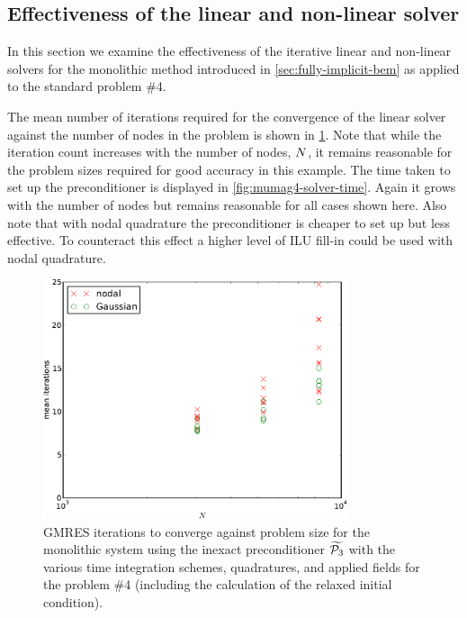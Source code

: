 \subsection{Effectiveness of the linear and non-linear solver}
\label{sec:effect-line-non}

In this section we examine the effectiveness of the iterative linear and non-linear solvers for the monolithic method introduced in \cref{sec:fully-implicit-bem} as applied to the \mumag standard problem \#4.

The mean number of iterations required for the convergence of the linear solver against the number of nodes in the problem is shown in \cref{fig:mumag4-solver-iterations}.
Note that while the iteration count increases with the number of nodes, $N$, it remains reasonable for the problem sizes required for good accuracy in this example.
The time taken to set up the preconditioner is displayed in \cref{fig:mumag4-solver-time}.
Again it grows with the number of nodes but remains reasonable for all cases shown here.
Also note that with nodal quadrature the preconditioner is cheaper to set up but less effective.
To counteract this effect a higher level of ILU fill-in could be used with nodal quadrature.

\begin{figure}
  \centering
  \includegraphics[width=0.8\textwidth]
  {plots/mumag4_monolithic_its/meanofnsolveritersvsinitialnnode.pdf}
  \caption{
    GMRES iterations to converge against problem size for the monolithic system using the inexact preconditioner $\widetilde{\mathcal{P}_3}$ with the various time integration schemes, quadratures, and applied fields for the \mumag problem \#4 (including the calculation of the relaxed initial condition).
}
  \label{fig:mumag4-solver-iterations}
\end{figure}

